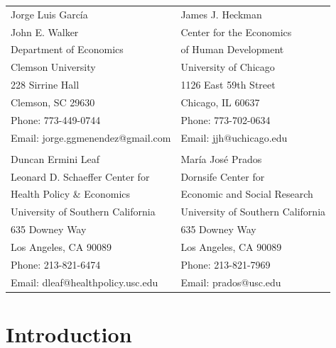 \bigskip
\begin{tabular}{ll}
Jorge Luis Garc\'{i}a                                          & James J. Heckman \\
John E. Walker                                     & Center for the Economics \\
 Department of Economics                   & of Human Development \\
Clemson University                                       & University of Chicago \\
228 Sirrine Hall                                       & 1126 East 59th Street \\
Clemson, SC 29630                                             & Chicago, IL 60637 \\
Phone: 773-449-0744                                       & Phone: 773-702-0634  \\
Email: jorge.ggmenendez@gmail.com                    & Email: jjh@uchicago.edu \\
                                                                          & \\
Duncan Ermini Leaf                                           & Mar\'{i}a Jos\'{e} Prados \\
Leonard D. Schaeffer Center for                       & Dornsife Center for  \\
Health Policy \& Economics                              & Economic and Social Research \\
University of Southern California                       & University of Southern California \\
635 Downey Way                                              & 635 Downey Way        \\
Los Angeles, CA 90089                                    & Los Angeles, CA 90089 \\
Phone: 213-821-6474                                       & Phone: 213-821-7969 \\
Email: dleaf@healthpolicy.usc.edu                     & Email: prados@usc.edu \\

\end{tabular}

\clearpage

\restoregeometry
\doublespacing
\setcounter{page}{1}

\section{Introduction}

